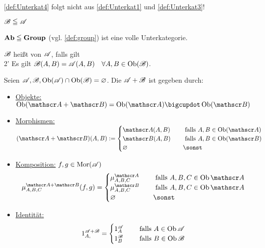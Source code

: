 \begin{bemerkung}
	\ref{def:Unterkat4} folgt nicht aus \ref{def:Unterkat1} und \ref{def:Unterkat3}!
\end{bemerkung}
\begin{notation}
	$\mathscr B \leqq \mathscr A$
\end{notation}
\begin{bsp}
	$\operatorname{\mathbf{Ab}} \leqq \operatorname{\mathbf{Group}}$ (vgl. \ref{def:group}) ist eine volle Unterkategorie.
\end{bsp}
$\mathscr B$ heißt  von $\mathscr A$, falls gilt \\
2' Es gilt $\mathscr B(A,B) = \mathscr A(A,B) \quad \forall A,B \in \operatorname{Ob}(\mathscr B)$.
\begin{definition}\enter
	Seien $\mathscr A, \mathscr B, \operatorname{Ob}(\mathscr A) \cap \operatorname{Ob}(\mathscr B) = \varnothing$. Die  $\mathscr A + \mathscr B$ ist gegeben durch:
	\begin{itemize}
		\item \ul{Objekte:} $\Ob(\CatA + \CatB) = \Ob(\CatA) \bigcupdot \Ob(\CatB)$
		\item \ul{Morphismen:} $(\CatA + \CatB)(A,B) := 
		\begin{cases}
			\CatA(A,B) \quad &\text{ falls } A,B \in \Ob(\CatA)\\
			\CatB(A,B) \quad &\text{ falls } A,B \in \Ob(\CatB)\\
			\emptyset \quad  &\sonst 
		\end{cases}$ 
		\item \ul{Komposition:} $f,g \in \operatorname{Mor}(\mathscr A)$
		\begin{align*}
			\mu_{A,B,C}^{\CatA + \CatB} (f,g) = 
			\begin{cases}
				\mu_{A,B,C}^{\CatA} \quad &\text{ falls } A,B,C \in \Ob{\CatA}\\
				\mu_{A,B,C}^{\CatB} \quad &\text{ falls } A,B,C \in \Ob{\CatA}\\
				\emptyset \quad & \sonst
			\end{cases}
		\end{align*}
		\item \ul{Identität:}
		\begin{align*}
		1_{A,}^{\mathscr A + \mathscr B} = 
		\begin{cases}
		1_{A}^{\mathscr A} \quad &\text{ falls } A \in \operatorname{Ob}{\mathscr A}\\
		1_{B}^{\mathscr B} \quad &\text{ falls } B \in \operatorname{Ob}{\mathscr B}
		\end{cases}
		\end{align*}
	\end{itemize}
\end{definition}
